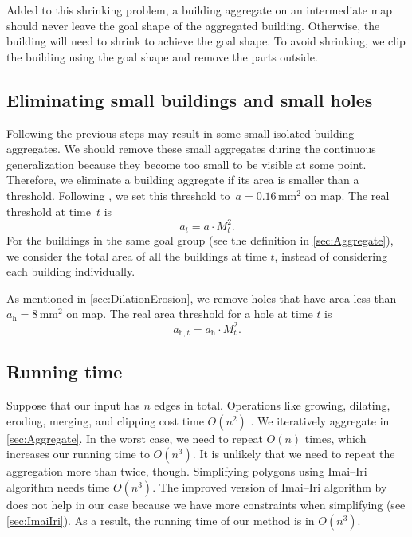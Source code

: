 Added to this shrinking problem, 
a building aggregate on an intermediate map should never leave
the goal shape of the aggregated building. 
Otherwise, the building will need to shrink 
to achieve the goal shape.
To avoid shrinking, 
we clip the building using the goal shape 
and remove the parts outside.


\subsection{Eliminating small buildings and small holes}
\label{sec:Eliminate}
Following the previous steps may result in 
some small isolated building aggregates.
We should remove these small aggregates during
the continuous generalization 
because they become too small to be visible at some point.
Therefore, we eliminate a building aggregate if its area is 
smaller than a threshold.
Following \citet{Stoter2009,Chaudhry2008}, 
we set this threshold to~$a=0.16\,\mathrm{mm}^2$ on map.
The real threshold at time~$t$ is
\[
a_t=a\cdot M_t^2.
\]
For the buildings in the same goal group 
(see the definition in \sect\ref{sec:Aggregate}),
we consider the total area of all the buildings at time $t$, 
instead of considering each building individually.

As mentioned in \sect\ref{sec:DilationErosion}, 
we remove holes that have area less than 
$a_\mathrm{h} = 8\,\mathrm{mm}^2$ on map.
The real area threshold for a hole at time $t$ is
\[
a_{\mathrm{h},t}=a_\mathrm{h}\cdot M_t^2.
\]

\subsection{Running time}
Suppose that our input has $n$ edges in total.
Operations like growing, dilating, 
eroding, merging, and clipping 
cost time $O(n^2)$ \citep{Greiner1998Clipping,Palfrader2015}.
We iteratively aggregate in \sect\ref{sec:Aggregate}.
In the worst case, we need to repeat $O(n)$ times,
which increases our running time to $O(n^3)$.
It is unlikely that we need to repeat the aggregation more than 
twice, though.
Simplifying polygons using Imai--Iri algorithm needs time
$O(n^3)$.
The improved version of Imai--Iri algorithm by 
\citet{Chan1996} does not help in our case
because we have more constraints when simplifying
(see \sect\ref{sec:ImaiIri}).
As a result, the running time of our method is in $O(n^3)$.


